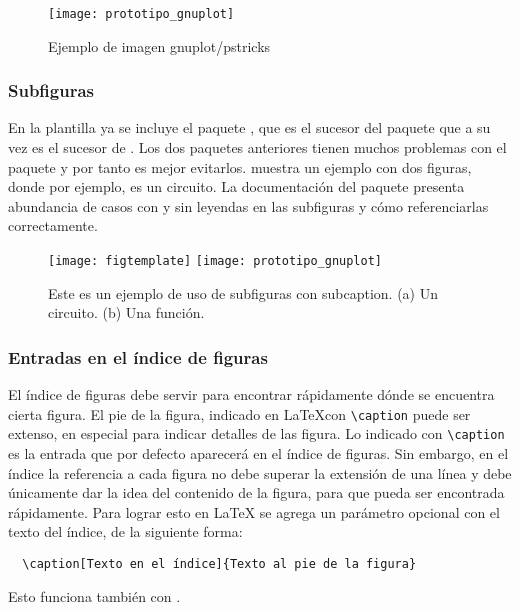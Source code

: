 \begin{figure}[htb]
  \centering
  \texttt{[image: prototipo\_gnuplot]}
  \caption{Ejemplo de imagen gnuplot/pstricks}
  \label{fig:pstricks}
\end{figure}

\subsubsection{Subfiguras}

En la plantilla ya se incluye el paquete , que es el
sucesor del paquete  que a su vez es el sucesor de
.  Los dos paquetes anteriores tienen muchos problemas
con el paquete  y por tanto es mejor evitarlos.
 muestra un ejemplo con dos figuras, donde por
ejemplo,  es un circuito.  La
documentación del paquete  presenta abundancia de
casos con y sin leyendas en las subfiguras y cómo referenciarlas
correctamente.

\begin{figure}[htb]
  \centering
  \subcaptionbox{\label{fig:subfigura_a}}%
    {\texttt{[image: figtemplate]}}
  \subcaptionbox{\label{fig:subfigura_b}}%
    {\texttt{[image: prototipo\_gnuplot]}}
  \caption[Ejemplo de figuras con subcaption]{Este es un ejemplo de
      uso de subfiguras con subcaption.  (a) Un circuito.  (b) Una
      función.}
  \label{fig:subfiguras}
\end{figure}


\subsubsection{Entradas en el índice de figuras}

El índice de figuras debe servir para encontrar rápidamente dónde se
encuentra cierta figura.  El pie de la figura, indicado en \LaTeX con
\verb+\caption+ puede ser extenso, en especial para indicar detalles
de las figura.  Lo indicado con \verb+\caption+ es la entrada que por
defecto aparecerá en el índice de figuras.  Sin embargo, en el índice
la referencia a cada figura no debe superar la extensión de una línea
y debe únicamente dar la idea del contenido de la figura, para que
pueda ser encontrada rápidamente.  Para lograr esto en \LaTeX{} se
agrega un parámetro opcional con el texto del índice, de la siguiente
forma:
\begin{verbatim}
  \caption[Texto en el índice]{Texto al pie de la figura}
\end{verbatim}
Esto funciona también con \lastablas.


